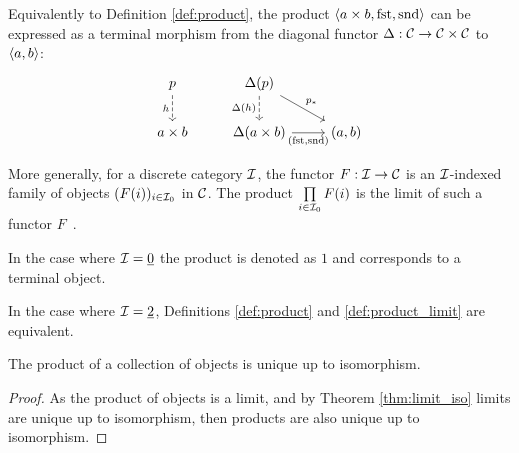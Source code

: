 \begin{definition}
	Equivalently to Definition \ref{def:product}, the product $\langle a\times b,
	\mathrm{fst}, \mathrm{snd}\rangle$ can be expressed as a terminal morphism from the diagonal functor $\Delta: \mathcal{C} \to \mathcal{C}\times \mathcal{C}$ to $\langle a, b\rangle$:
	\[\begin{tikzcd}[ampersand replacement=\&]
		p \& {\Delta(p)} \\
		{a\times b} \& {\Delta(a\times b)} \& {(a,b)}
		\arrow["h"', dashed, from=1-1, to=2-1]
		\arrow["{\Delta(h)}"', dashed, from=1-2, to=2-2]
		\arrow["{p_*}", from=1-2, to=2-3]
		\arrow["{(\mathrm{fst}, \mathrm{snd})}"', from=2-2, to=2-3]
	\end{tikzcd}\]

\end{definition}

\begin{definition}

	More generally, for a discrete category $\mathcal{I}$, the functor $F:\mathcal{I}\to \mathcal{C}$ is an
	$\mathcal{I}$-indexed family of objects $(F(i))_{i\in \mathcal{I}_0}$ in $\mathcal{C}$. The product
	$\prod\limits_{i\in \mathcal{I}_0} F(i)$ is the limit of such a functor
	$F$~\parencite{leinster:basic_category_theory}.
\end{definition}

\begin{remark}
	In the case where $\mathcal{I}=\underline{0}$ the product is denoted as $1$ and
	corresponds to a terminal object.
\end{remark}

\begin{remark}
	In the case where $\mathcal{I}=\underline{2}$, Definitions \ref{def:product} and
	\ref{def:product_limit} are equivalent.
\end{remark}

\begin{theorem}
	The product of a collection of objects is unique up to isomorphism.

	\begin{proof}
		As the product of objects is a limit, and by Theorem \ref{thm:limit_iso}
		limits are unique up to isomorphism, then products are also unique up to
		isomorphism.
	\end{proof}
\end{theorem}

